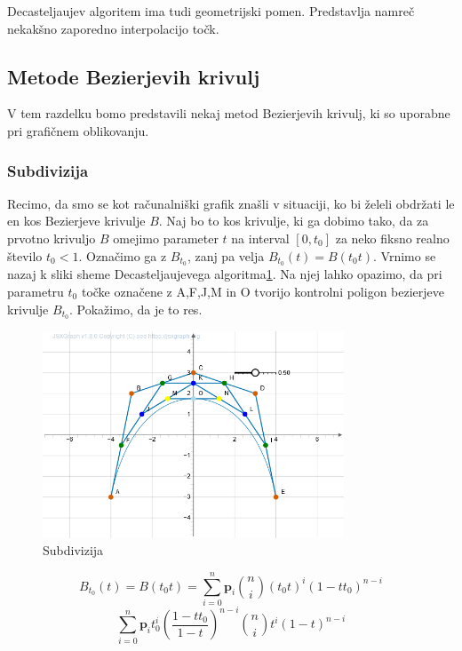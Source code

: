 \documentclass[isrm2, tisk]{fmfdelo}
\begin{document}
    Decasteljaujev algoritem ima tudi geometrijski pomen.
    Predstavlja namreč nekakšno zaporedno interpolacijo točk.

    \subsection{Metode Bezierjevih krivulj}
    V tem razdelku bomo predstavili nekaj metod Bezierjevih krivulj, ki so uporabne pri grafičnem oblikovanju.

    \subsubsection{Subdivizija}
    Recimo, da smo se kot računalniški grafik znašli v situaciji, ko bi želeli obdržati le en kos Bezierjeve krivulje $B$.
    Naj bo to kos krivulje, ki ga dobimo tako, da za prvotno krivuljo $B$ omejimo parameter $t$ na interval $[0,t_0]$ za neko fiksno realno število $t_0<1$.
    Označimo ga z $B_{t_0}$, zanj pa velja $B_{t_0}(t)=B(t_{0}t)$.
    Vrnimo se nazaj k sliki sheme Decasteljaujevega algoritma\ref{fig:subdivizija}.
    Na njej lahko opazimo, da pri parametru $t_0$ točke označene z A,F,J,M in O tvorijo kontrolni poligon bezierjeve krivulje $B_{t_0}$.
    Pokažimo, da je to res.

    \begin{figure}[h!]
        \centering
        \includegraphics[width=0.8\textwidth]{images/subidivizja.png}
        \caption{Subdivizija}
        \label{fig:subdivizija}
    \end{figure}

    \[B_{t_0}(t) = B(t_{0}t) = \sum_{i=0}^{n}\mathbf{p}_{i}\binom{n}{i}(t_{0}t)^i(1-tt_0)^{n-i} \]
    \[ \sum_{i=0}^{n}\mathbf{p}_{i}t_0^{i}\left(\frac{1-tt_0}{1-t}\right)^{n-i}\binom{n}{i}t^i(1-t)^{n-i} \]
\end{document}
